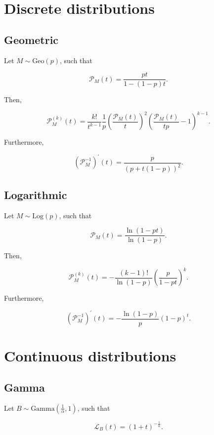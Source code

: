 \documentclass[11pt, english]{article}\usepackage[]{graphicx}\usepackage[]{color}
\begin{document}
\section{Discrete distributions}

\subsection{Geometric}

Let $M \sim \mathrm{Geo}(p)$, such that

\begin{equation*}
  \mathcal{P}_M(t) = \frac{p t}{1 - (1 - p) t}.
\end{equation*}

Then,

$$ \mathcal{P}_M^{(k)}(t) = \frac{k!}{t^{k-1}} \frac{1}{p} \left(\frac{\mathcal{P}_M(t)}{t}\right)^2 \left(\frac{\mathcal{P}_M(t)}{t p} - 1\right)^{k - 1}. $$


Furthermore,

$$ \left(\mathcal{P}_M^{-1}\right)^\prime(t) = \frac{p}{(p + t (1 - p))^2}. $$

\subsection{Logarithmic}

Let $M \sim \mathrm{Log}(p)$, such that

$$ \mathcal{P}_M(t) = \frac{\ln(1 - pt)}{\ln(1 - p)}. $$

Then,

$$ \mathcal{P}_M^{(k)}(t) = -\frac{(k - 1)!}{\ln(1 - p)} \left(\frac{p}{1 - pt}\right)^k. $$

Furthermore,

$$ \left( \mathcal{P}_M^{-1} \right)^\prime (t) = -\frac{\ln(1 - p)}{p} (1 - p)^t. $$

\section{Continuous distributions}

\subsection{Gamma}

Let $B \sim \mathrm{Gamma}\left(\frac{1}{\alpha}, 1\right)$, such that

\begin{equation}
  \mathcal{L}_B(t) = (1 + t)^{-\frac{1}{\alpha}}.
\end{equation}
\end{document}
